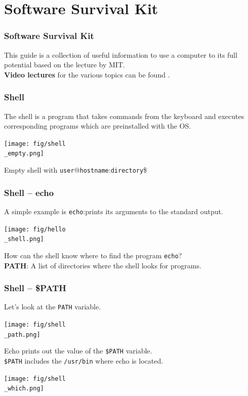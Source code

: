 \documentclass{beamer}
\begin{document}
\section{Software Survival Kit}
\begin{frame}
  \frametitle{Software Survival Kit}
  This guide is a collection of useful information to use a computer to its full potential based on the lecture  by MIT.\\
  \vspace{5mm}
  \textbf{Video lectures} for the various topics can be found .\\
\end{frame}
\begin{frame}
  \frametitle{Shell }
  The shell is a program that takes commands from the keyboard and executes corresponding programs which are preinstalled with the OS.\\
  \begin{center}
    \texttt{[image: fig/shell\\\_empty.png]}
  \end{center}
Empty shell with \texttt{user}@\texttt{hostname}:\texttt{directory}\$
\end{frame}
\begin{frame}
  \frametitle{Shell -- echo}
  A simple example is \texttt{echo}:prints its arguments to the standard output.\\
  \begin{center}
    \texttt{[image: fig/hello\\\_shell.png]}
  \end{center}
  How can the shell know where to find the program \texttt{echo}?\\
  \vspace{5mm}
  \textbf{PATH}: A list of directories where the shell looks for programs.\\
\end{frame}
\begin{frame}
  \frametitle{Shell -- \$PATH}
  Let's look at the \texttt{PATH} variable.\\
  \begin{center}
    \texttt{[image: fig/shell\\\_path.png]}
  \end{center}
  Echo prints out the value of the \texttt{\$PATH} variable.\\
  \texttt{\$PATH} includes the \texttt{/usr/bin} where echo is located.\\
  \begin{center}
    \texttt{[image: fig/shell\\\_which.png]}
  \end{center}
\end{frame}
\end{document}
